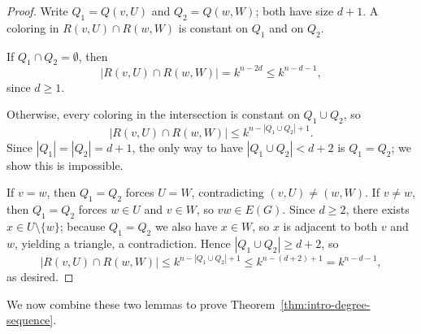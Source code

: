 \documentclass[12pt,reqno]{amsart}
\theoremstyle{definition}
\begin{document}
\begin{proof}
Write $Q_1=Q(v,U)$ and $Q_2=Q(w,W)$; both have size $d+1$. A coloring in $R(v,U)\cap R(w,W)$ is constant on $Q_1$ and on $Q_2$.

If $Q_1\cap Q_2=\emptyset$, then
\[
|R(v,U)\cap R(w,W)|=k^{n-2d}\leq k^{n-d-1},
\]
since $d\geq 1$.

Otherwise, every coloring in the intersection is constant on $Q_1\cup Q_2$, so
\[
|R(v,U)\cap R(w,W)|\leq k^{n-|Q_1\cup Q_2|+1}.
\]
Since $|Q_1|=|Q_2|=d+1$, the only way to have $|Q_1\cup Q_2|<d+2$ is $Q_1=Q_2$; we show this is impossible.

If $v=w$, then $Q_1=Q_2$ forces $U=W$, contradicting $(v,U)\neq(w,W)$. If $v\neq w$, then $Q_1=Q_2$ forces $w\in U$ and $v\in W$, so $vw\in E(G)$. Since $d\geq 2$, there exists $x\in U\setminus\{w\}$; because $Q_1=Q_2$ we also have $x\in W$, so $x$ is adjacent to both $v$ and $w$, yielding a triangle, a contradiction. Hence $|Q_1\cup Q_2|\geq d+2$, so
\[
|R(v,U)\cap R(w,W)|\leq k^{n-|Q_1\cup Q_2|+1}\leq k^{n-(d+2)+1}=k^{n-d-1},
\]
as desired.
\end{proof}

We now combine these two lemmas to prove Theorem~\ref{thm:intro-degree-sequence}.
\end{document}
